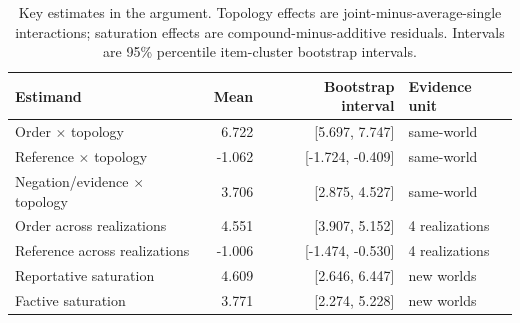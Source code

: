 \begin{table}[H]
\centering
\small
\begin{tabularx}{\columnwidth}{Xrrl}
\toprule
Estimand & Mean & Bootstrap interval & Evidence unit \\
\midrule
Order $\times$ topology & 6.722 & [5.697, 7.747] & same-world \\
Reference $\times$ topology & -1.062 & [-1.724, -0.409] & same-world \\
Negation/evidence $\times$ topology & 3.706 & [2.875, 4.527] & same-world \\
Order across realizations & 4.551 & [3.907, 5.152] & 4 realizations \\
Reference across realizations & -1.006 & [-1.474, -0.530] & 4 realizations \\
Reportative saturation & 4.609 & [2.646, 6.447] & new worlds \\
Factive saturation & 3.771 & [2.274, 5.228] & new worlds \\
\bottomrule
\end{tabularx}
\caption{Key estimates in the argument. Topology effects are joint-minus-average-single interactions; saturation effects are compound-minus-additive residuals. Intervals are 95\% percentile item-cluster bootstrap intervals.}
\label{tab:key-estimates}
\end{table}
